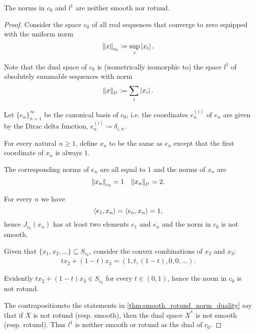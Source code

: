 \begin{example}\label{thm:c0_l1_not_smooth_rotund}\cite[exercise 2.37(c)]{Phelps1993}
  The norms in \( c_0 \) and \( l^1 \) are neither smooth nor rotund.
\end{example}
\begin{proof}
  Consider the space \( c_0 \) of all real sequences that converge to zero equipped with the uniform norm
  \begin{equation*}
    \left\Vert x \right\Vert_{c_0} \coloneqq \sup_i \left\vert x_i \right\vert.
  \end{equation*}

  Note that the dual space of \( c_0 \) is (isometrically isomorphic to) the space \( l^1 \) of absolutely summable sequences with norm
  \begin{equation*}
    \left\Vert x \right\Vert_{l^1} \coloneqq \sum_i \left\vert x_i \right\vert.
  \end{equation*}

  Let \( \{ e_n \}_{n=1}^\infty \) be the canonical basis of \( c_0 \), i.e. the coordinates \( e^{(i)}_n \) of \( e_n \) are given by the Dirac delta function, \( e^{(i)}_n \coloneqq \delta_{i,n} \).

  For every natural \( n \geq 1 \), define \( x_n \) to be the same as \( e_n \) except that the first coordinate of \( x_n \) is always \( 1 \).

  The corresponding norms of \( e_n \) are all equal to 1 and the norms of \( x_n \) are
  \begin{align*}
    \left\Vert x_n \right\Vert_{c_0} = 1
    &&
    \left\Vert x_n \right\Vert_{l^1} = 2.
  \end{align*}

  For every \( n \) we have
  \begin{equation*}
    \left\langle e_1, x_n \right\rangle = \left\langle e_n, x_n \right\rangle = 1,
  \end{equation*}
  hence \( J_{c_0}(x_n) \) has at least two elements \( e_1 \) and \( e_n \) and the norm in \( c_0 \) is not smooth.

  Given that \( \{ x_1, x_2, \ldots \} \subseteq S_{c_0} \), consider the convex combinations of \( x_2 \) and \( x_3 \):
  \begin{align*}
    tx_2 + (1-t)x_3
    =
    (1, t, (1-t), 0, 0, \ldots).
  \end{align*}

  Evidently \( tx_2 + (1-t)x_3 \in S_{c_0} \) for every \( t \in (0, 1) \), hence the norm in \( c_0 \) is not rotund.

  The contrapositions\LEM to the statements in \cref{thm:smooth_rotund_norm_duality} say that if \( X \) is not rotund (resp. smooth), then the dual space \( X^* \) is not smooth (resp. rotund). Thus \( l^1 \) is neither smooth or rotund as the dual of \( c_0 \).
\end{proof}

